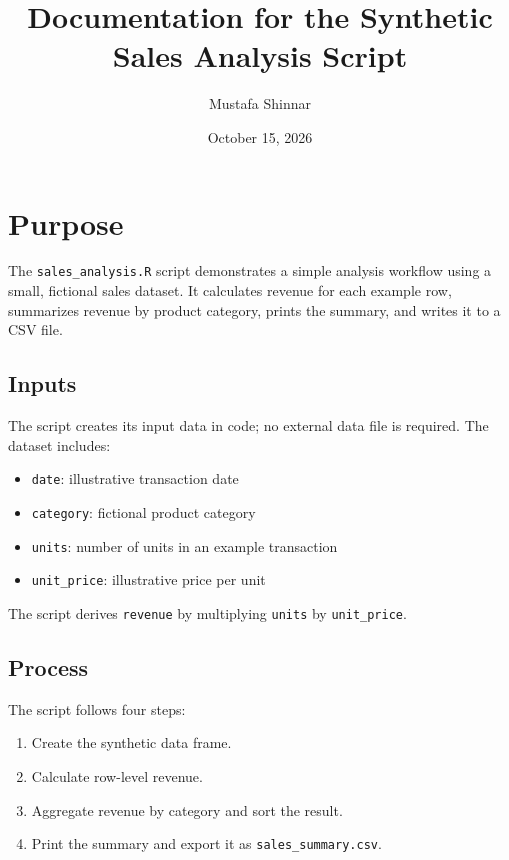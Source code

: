 \documentclass[
]{article}
\title{Documentation for the Synthetic Sales Analysis Script}
\author{Mustafa Shinnar}
\date{October 15, 2026}
\providecommand{\tightlist}{%
  \setlength{\itemsep}{0pt}\setlength{\parskip}{0pt}}
\begin{document}
\maketitle

\section{Purpose}\label{purpose}

The \texttt{sales\_analysis.R} script demonstrates a simple analysis
workflow using a small, fictional sales dataset. It calculates revenue
for each example row, summarizes revenue by product category, prints the
summary, and writes it to a CSV file.

\subsection{Inputs}\label{inputs}

The script creates its input data in code; no external data file is
required. The dataset includes:

\begin{itemize}
\tightlist
\item
  \texttt{date}: illustrative transaction date
\item
  \texttt{category}: fictional product category
\item
  \texttt{units}: number of units in an example transaction
\item
  \texttt{unit\_price}: illustrative price per unit
\end{itemize}

The script derives \texttt{revenue} by multiplying \texttt{units} by
\texttt{unit\_price}.

\subsection{Process}\label{process}

The script follows four steps:

\begin{enumerate}
\def\labelenumi{\arabic{enumi}.}
\tightlist
\item
  Create the synthetic data frame.
\item
  Calculate row-level revenue.
\item
  Aggregate revenue by category and sort the result.
\item
  Print the summary and export it as \texttt{sales\_summary.csv}.
\end{enumerate}
\end{document}
